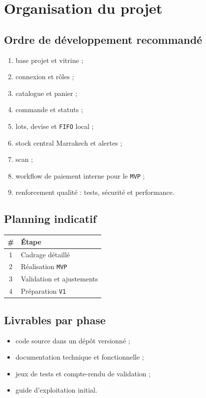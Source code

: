 \documentclass[11pt,a4paper]{scrreprt}
\newcommand{\code}[1]{\texttt{#1}}
\begin{document}
\chapter{Organisation du projet}

\section{Ordre de développement recommandé}
\begin{enumerate}
  \item base projet et vitrine ;
  \item connexion et rôles ;
  \item catalogue et panier ;
  \item commande et statuts ;
  \item lots, devise et \code{FIFO} local ;
  \item stock central Marrakech et alertes ;
  \item scan ;
  \item workflow de paiement interne pour le \code{MVP} ;
  \item renforcement qualité : tests, sécurité et performance.
\end{enumerate}

\section{Planning indicatif}
\begin{table}[h]
\centering
\begin{tabular}{cl}
\toprule
\# & Étape \\
\midrule
1 & Cadrage détaillé \\
2 & Réalisation \code{MVP} \\
3 & Validation et ajustements \\
4 & Préparation \code{V1} \\
\bottomrule
\end{tabular}
\end{table}

\section{Livrables par phase}
\begin{itemize}
  \item code source dans un dépôt versionné ;
  \item documentation technique et fonctionnelle ;
  \item jeux de tests et compte-rendu de validation ;
  \item guide d'exploitation initial.
\end{itemize}
\end{document}
